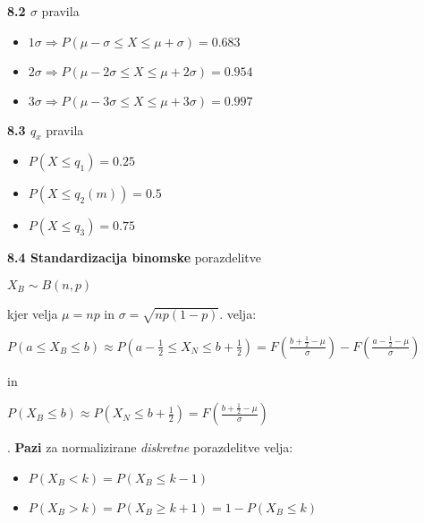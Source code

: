 \documentclass{article}
\begin{document}
\begin{multicols}{3}
\textbf{8.2 $\sigma$}  pravila

\begin{itemize}
    \item \begin{math}
        1 \sigma \Rightarrow P(\mu - \sigma \leq X \leq \mu + \sigma) = 0.683
    \end{math}

    \item \begin{math}
        2 \sigma \Rightarrow P(\mu - 2\sigma \leq X \leq \mu + 2\sigma) = 0.954
    \end{math}

    \item \begin{math}
        3 \sigma \Rightarrow P(\mu - 3\sigma \leq X \leq \mu + 3\sigma) = 0.997
    \end{math}
\end{itemize}

\textbf{8.3 $q_x$} pravila

\begin{itemize}
    \item $P (X \leq q_1) = 0.25$
    \item $P (X \leq q_2(m)) = 0.5$
    \item $P (X \leq q_3) = 0.75$
\end{itemize}

\textbf{8.4 Standardizacija binomske} porazdelitve
\begin{center}
    \begin{math}
        X_B \sim B(n, p)
    \end{math}
\end{center}
kjer velja $\mu = np$ in $\sigma = \sqrt{np(1-p)}$.
velja:
\begin{center}
    \begin{math}
        P(a \leq X_B \leq b) \approx P(a - \frac{1}{2} \leq X_N \leq b + \frac{1}{2})
        = F(\frac{b + \frac{1}{2} - \mu}{\sigma}) - F(\frac{a - \frac{1}{2} - \mu}{\sigma})
    \end{math}
\end{center}
in
\begin{center}
    \begin{math}
        P(X_B \leq b) \approx P(X_N \leq b + \frac{1}{2}) = F(\frac{b + \frac{1}{2} - \mu}{\sigma})
    \end{math}
\end{center}.
\textbf{Pazi} za normalizirane \textit{diskretne} porazdelitve velja:
\begin{itemize}
    \item $P(X_B < k) = P(X_B \leq k - 1)$
    \item $P(X_B > k) = P(X_B \geq k + 1) = 1 - P(X_B \leq k)$
\end{itemize}



\end{multicols}
\end{document}
